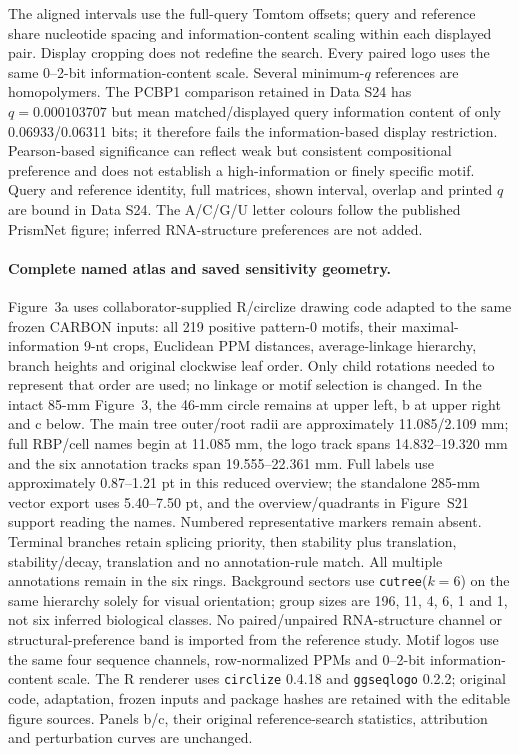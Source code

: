 \documentclass[11pt]{article}
\begin{document}
The aligned intervals use the full-query Tomtom offsets; query and reference share nucleotide spacing and information-content scaling within each displayed pair. Display cropping does not redefine the search. Every paired logo uses the same 0--2-bit information-content scale. Several minimum-$q$ references are homopolymers. The PCBP1 comparison retained in Data S24 has $q=0.000103707$ but mean matched/displayed query information content of only 0.06933/0.06311 bits; it therefore fails the information-based display restriction. Pearson-based significance can reflect weak but consistent compositional preference and does not establish a high-information or finely specific motif. Query and reference identity, full matrices, shown interval, overlap and printed $q$ are bound in Data S24. The A/C/G/U letter colours follow the published PrismNet figure; inferred RNA-structure preferences are not added.

\paragraph{Complete named atlas and saved sensitivity geometry.} Figure~3a uses collaborator-supplied R/circlize drawing code adapted to the same frozen CARBON inputs: all 219 positive pattern-0 motifs, their maximal-information 9-nt crops, Euclidean PPM distances, average-linkage hierarchy, branch heights and original clockwise leaf order. Only child rotations needed to represent that order are used; no linkage or motif selection is changed. In the intact 85-mm Figure~3, the 46-mm circle remains at upper left, b at upper right and c below. The main tree outer/root radii are approximately 11.085/2.109 mm; full RBP/cell names begin at 11.085 mm, the logo track spans 14.832--19.320 mm and the six annotation tracks span 19.555--22.361 mm. Full labels use approximately 0.87--1.21 pt in this reduced overview; the standalone 285-mm vector export uses 5.40--7.50 pt, and the overview/quadrants in Figure~S21 support reading the names. Numbered representative markers remain absent. Terminal branches retain splicing priority, then stability plus translation, stability/decay, translation and no annotation-rule match. All multiple annotations remain in the six rings. Background sectors use \texttt{cutree}(\(k=6\)) on the same hierarchy solely for visual orientation; group sizes are 196, 11, 4, 6, 1 and 1, not six inferred biological classes. No paired/unpaired RNA-structure channel or structural-preference band is imported from the reference study. Motif logos use the same four sequence channels, row-normalized PPMs and 0--2-bit information-content scale. The R renderer uses \texttt{circlize} 0.4.18 and \texttt{ggseqlogo} 0.2.2; original code, adaptation, frozen inputs and package hashes are retained with the editable figure sources. Panels b/c, their original reference-search statistics, attribution and perturbation curves are unchanged.
\end{document}
